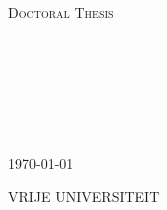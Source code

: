 \begin{titlepage}

\begin{center}

\textsc{\LARGE \univname}\\[1.5cm] %
\textsc{\Large Doctoral Thesis}\\[0.5cm] %

\HRule \\[0.4cm] %
{\huge \bfseries \ttitle}\\[0.4cm] %
\HRule \\[1.5cm] %

\begin{minipage}{0.4\textwidth}
\begin{center} \large
\href{}{\authorname} %
\end{center}
\end{minipage}\\[3cm]



\groupname\\\deptname\\[2cm] %

{\large \today}\\[4cm] %

\vfill
\end{center}


\begin{center}
	VRIJE UNIVERSITEIT

	\vspace{1cm}


\end{center}
\end{titlepage}
